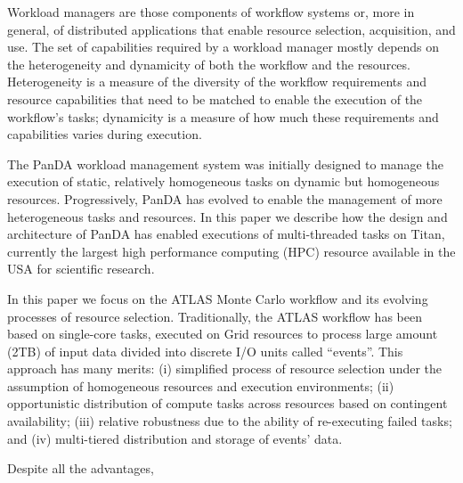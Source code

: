 Workload managers are those components of workflow systems or, more in general,
of distributed applications that enable resource selection, acquisition, and
use. The set of capabilities required by a workload manager mostly depends on
the heterogeneity and dynamicity of both the workflow and the resources.
Heterogeneity is a measure of the diversity of the workflow requirements and
resource capabilities that need to be matched to enable the execution of the
workflow's tasks; dynamicity is a measure of how much these requirements and
capabilities varies during execution.

The PanDA workload management system was initially designed to manage the execution of static, relatively homogeneous tasks on dynamic but homogeneous resources. Progressively, PanDA has evolved to enable the management of more heterogeneous tasks and resources. In this paper we describe how the design and architecture of PanDA has enabled executions of multi-threaded tasks on Titan, currently the largest high performance computing (HPC) resource available in the USA for scientific research.

In this paper we focus on the ATLAS Monte Carlo workflow and its evolving processes of resource selection.
Traditionally, the ATLAS workflow has been based on single-core tasks, executed
on Grid resources to process large amount (2TB) of input data divided into
discrete I/O units called ``events''. This approach has many merits: (i)
simplified process of resource selection under the assumption of homogeneous
resources and execution environments; (ii) opportunistic distribution of compute
tasks across resources based on contingent availability; (iii) relative
robustness due to the ability of re-executing failed tasks; and (iv)
multi-tiered distribution and storage of events' data.

Despite all the advantages,

